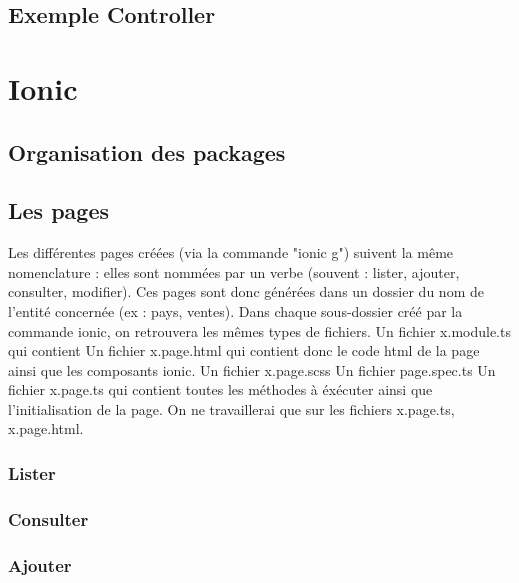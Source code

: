		\subsection{Exemple Controller}


	\section{Ionic}

		\subsection{Organisation des packages}


		\subsection{Les pages}

				Les différentes pages créées (via la commande "ionic g") suivent la même nomenclature : elles sont nommées par un verbe (souvent : lister, ajouter, consulter, modifier). Ces pages sont donc générées dans un dossier du nom de l'entité concernée (ex : pays, ventes).
				Dans chaque sous-dossier créé par la commande ionic, on retrouvera les mêmes types de fichiers.
				Un fichier x.module.ts qui contient
				Un fichier x.page.html qui contient donc le code html de la page ainsi que les composants ionic.
				Un fichier x.page.scss
				Un fichier page.spec.ts
				Un fichier x.page.ts qui contient toutes les méthodes à éxécuter ainsi que l'initialisation de la page.
				On ne travaillerai que sur les fichiers x.page.ts, x.page.html.

			\subsubsection{Lister}

						
			\subsubsection{Consulter}


			\subsubsection{Ajouter}

